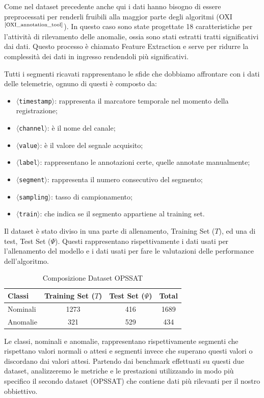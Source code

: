 Come nel dataset precedente anche qui i dati hanno bisogno di essere preprocessati per renderli fruibili alla maggior parte degli algoritmi (OXI$^{\text{\cite{OXI_annotation_tool}}}$). In questo caso sono state progettate 18 caratteristiche per l'attività di rilevamento delle anomalie, ossia sono stati estratti tratti significativi dai dati. Questo processo è chiamato Feature Extraction e serve per ridurre la complessità dei dati in ingresso rendendoli più significativi.

Tutti i segmenti ricavati rappresentano le sfide che dobbiamo affrontare con i dati delle telemetrie, ognuno di questi è composto da:
\begin{itemize}
    \item $\langle$\texttt{timestamp}$\rangle$: rappresenta il marcatore temporale nel momento della registrazione;
    \item $\langle$\texttt{channel}$\rangle$: è il nome del canale;
    \item $\langle$\texttt{value}$\rangle$: è il valore del segnale acquisito;
    \item $\langle$\texttt{label}$\rangle$: rappresentano le annotazioni certe, quelle annotate manualmente;
    \item $\langle$\texttt{segment}$\rangle$: rappresenta il numero consecutivo del segmento;
    \item $\langle$\texttt{sampling}$\rangle$: tasso di campionamento;
    \item $\langle$\texttt{train}$\rangle$: che indica se il segmento appartiene al training set.
    
\end{itemize}

Il dataset è stato diviso in una parte di allenamento, Training Set ($T$), ed una di test, Test Set ($\Psi$). Questi rappresentano rispettivamente i dati usati per l'allenamento del modello e i dati usati per fare le valutazioni delle performance dell'algoritmo.

\begin{table}[h]
    \centering
    \begin{tabular}{|l|c|c|c|}
        \hline
        \textbf{Classi} &\textbf{Training Set} ($T$) & \textbf{Test Set ($\Psi$)}&\textbf{Total} \\
        \hline
         Nominali& 1273&416 &1689 \\
         Anomalie& 321&529 &434\\
         \hline
    \end{tabular}
    \caption{Composizione Dataset OPS\textunderscore SAT}
    \label{tab:dataset_op-sat}
\end{table}

Le classi, nominali e anomalie, rappresentano rispettivamente segmenti che rispettano valori normali o attesi e segmenti invece che superano questi valori o discordano dai valori attesi.
Partendo dai benchmark effettuati su questi due dataset, analizzeremo le metriche e le prestazioni utilizzando in modo più specifico il secondo dataset (OPS\textunderscore SAT) che contiene dati più rilevanti per il nostro obbiettivo.

